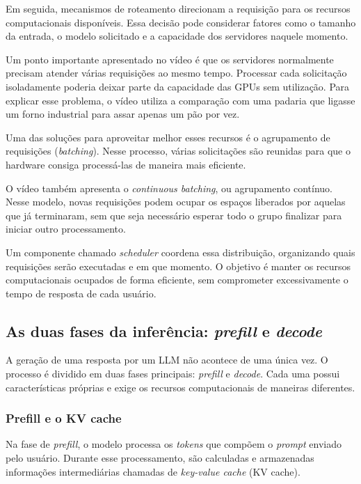 \documentclass[12pt, a4paper]{article}
\begin{document}
Em seguida, mecanismos de roteamento direcionam a requisição para os recursos computacionais disponíveis. Essa decisão pode considerar fatores como o tamanho da entrada, o modelo solicitado e a capacidade dos servidores naquele momento.

Um ponto importante apresentado no vídeo é que os servidores normalmente precisam atender várias requisições ao mesmo tempo. Processar cada solicitação isoladamente poderia deixar parte da capacidade das GPUs sem utilização. Para explicar esse problema, o vídeo utiliza a comparação com uma padaria que ligasse um forno industrial para assar apenas um pão por vez.

Uma das soluções para aproveitar melhor esses recursos é o agrupamento de requisições (\textit{batching}). Nesse processo, várias solicitações são reunidas para que o hardware consiga processá-las de maneira mais eficiente.

O vídeo também apresenta o \textit{continuous batching}, ou agrupamento contínuo. Nesse modelo, novas requisições podem ocupar os espaços liberados por aquelas que já terminaram, sem que seja necessário esperar todo o grupo finalizar para iniciar outro processamento.

Um componente chamado \textit{scheduler} coordena essa distribuição, organizando quais requisições serão executadas e em que momento. O objetivo é manter os recursos computacionais ocupados de forma eficiente, sem comprometer excessivamente o tempo de resposta de cada usuário.

\subsection{As duas fases da inferência: \textit{prefill} e \textit{decode}}

A geração de uma resposta por um LLM não acontece de uma única vez. O processo é dividido em duas fases principais: \textit{prefill} e \textit{decode}. Cada uma possui características próprias e exige os recursos computacionais de maneiras diferentes.

\subsubsection{Prefill e o KV cache}
Na fase de \textit{prefill}, o modelo processa os \textit{tokens} que compõem o \textit{prompt} enviado pelo usuário. Durante esse processamento, são calculadas e armazenadas informações intermediárias chamadas de \textit{key-value cache} (KV cache).
\end{document}
